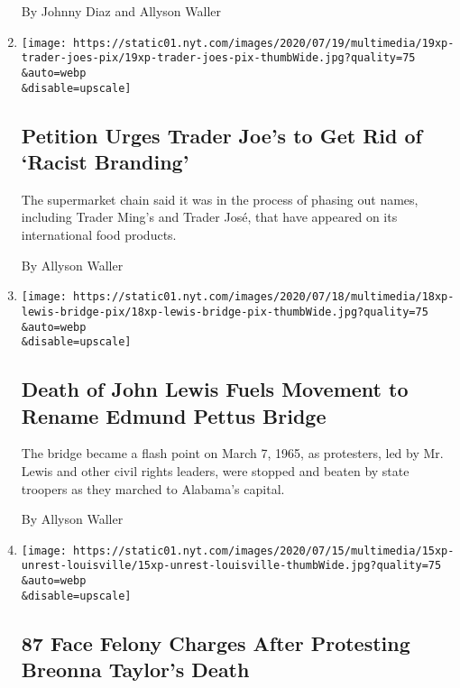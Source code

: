 \begin{enumerate}
  By Johnny Diaz and Allyson Waller
\item
  \href{/2020/07/19/business/trader-joes-petition.html}{}

  \texttt{[image: https://static01.nyt.com/images/2020/07/19/multimedia/19xp-trader-joes-pix/19xp-trader-joes-pix-thumbWide.jpg?quality=75\\\&auto=webp\\\&disable=upscale]}

  \hypertarget{petition-urges-trader-joes-to-get-rid-of-racist-branding}{%
  \subsection{Petition Urges Trader Joe's to Get Rid of `Racist
  Branding'}\label{petition-urges-trader-joes-to-get-rid-of-racist-branding}}

  The supermarket chain said it was in the process of phasing out names,
  including Trader Ming's and Trader José, that have appeared on its
  international food products.

  By Allyson Waller
\item
  \href{/2020/07/18/us/politics/edmund-pettus-bridge-renamed-john-lewis.html}{}

  \texttt{[image: https://static01.nyt.com/images/2020/07/18/multimedia/18xp-lewis-bridge-pix/18xp-lewis-bridge-pix-thumbWide.jpg?quality=75\\\&auto=webp\\\&disable=upscale]}

  \hypertarget{death-of-john-lewis-fuels-movement-to-rename-edmund-pettus-bridge}{%
  \subsection{Death of John Lewis Fuels Movement to Rename Edmund Pettus
  Bridge}\label{death-of-john-lewis-fuels-movement-to-rename-edmund-pettus-bridge}}

  The bridge became a flash point on March 7, 1965, as protesters, led
  by Mr. Lewis and other civil rights leaders, were stopped and beaten
  by state troopers as they marched to Alabama's capital.

  By Allyson Waller
\item
  \href{/2020/07/15/us/protesters-arrested-breonna-taylor-kentucky.html}{}

  \texttt{[image: https://static01.nyt.com/images/2020/07/15/multimedia/15xp-unrest-louisville/15xp-unrest-louisville-thumbWide.jpg?quality=75\\\&auto=webp\\\&disable=upscale]}

  \hypertarget{87-face-felony-charges-after-protesting-breonna-taylors-death}{%
  \subsection{87 Face Felony Charges After Protesting Breonna Taylor's
  Death}\label{87-face-felony-charges-after-protesting-breonna-taylors-death}}


\end{enumerate}
